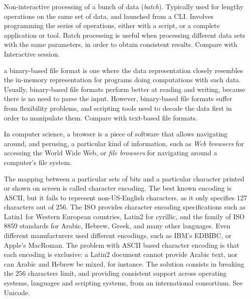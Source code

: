 {
    	Non-interactive processing of a bunch of data (\emph{batch}).
        Typically used for lengthy operations on the same set of data,
        and launched from a \gls{CLI}. Involves programming the series
        of operations, either with a script, or a complete application
        or tool. Batch processing is useful when processing different
        data sets with the same parameters, in order to obtain
        consistent results. Compare with \gls{Interactive session}.
}

{
    	a binary-based file format is one where the data representation
        closely resembles the in-memory representation for programs
        doing computations with such data. Usually, binary-based file
        formats perform better at reading and writing, because there is
        no need to parse the input. However, binary-based file formats
        suffer from flexibility problems, and scripting tools need to
        decode the data first in order to manipulate them. Compare with
        \gls{text-based file formats}.
}

{
    	In computer science, a browser is a piece of software that
        allows navigating around, and perusing, a particular kind of
        information, such as \emph{Web browsers} for accessing the
        \gls{World Wide Web}, or \emph{file browsers} for navigating
        around a computer's file system.
}

{
    	The mapping between a particular sets of bits and a particular
        character printed or shown on screen is called character
        encoding. The best known encoding is \gls{ASCII}, but it fails
        to represent non-US-English characters, as it only specifies
        127 characters out of 256. The ISO provides character encoding
        specifications such as Latin1 for Western European countries,
        Latin2 for cyrillic, and the family of ISO 8859 standards for
        Arabic, Hebrew, Greek, and many other languages. Even different
        manufacturers used different encodings, such as IBM's EDBIBC,
        or Apple's MacRoman. The problem with ASCII based character
        encoding is that each encoding is exclusive: a Latin2 document
        cannot provide Arabic text, nor can Arabic and Hebrew be mixed,
        for instance. The solution consists in breaking the 256
        characters limit, and providing consistent support across
        operating systems, languages and scripting systems, from an
        international consortium. See \gls{Unicode}.
}

